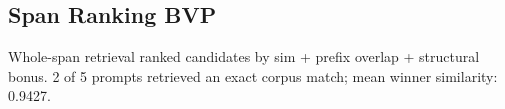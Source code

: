 \subsection{Span Ranking BVP}
Whole-span retrieval ranked candidates by sim + prefix overlap + structural bonus.
2 of 5 prompts retrieved an exact corpus match; mean winner similarity: 0.9427.
